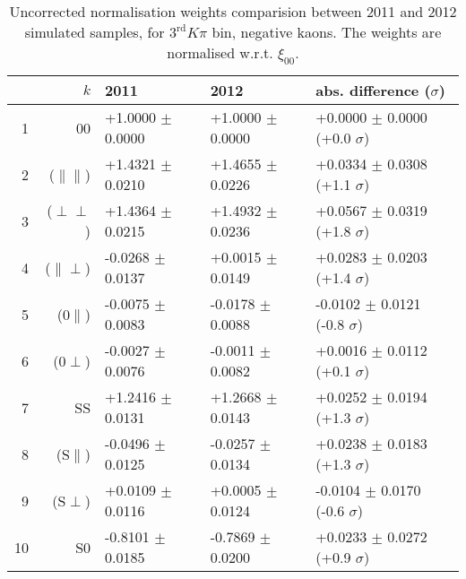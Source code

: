 \begin{table}[hbtp]
  \caption{\small Uncorrected normalisation weights comparision between 2011 and 2012 simulated samples, for $3^{\text{rd}}K\pi$ bin, negative kaons. The weights are normalised w.r.t. $\xi_{00}$.}
  \center\footnotesize
 \begin{tabular}{r r l l l}
  \multicolumn{2}{r}{$k$}            & 2011             & 2012              &   abs. difference ($\sigma$)        \\
   \hline 
  1  & 00                     & +1.0000 $\pm$  0.0000  &  +1.0000 $\pm$  0.0000  &  +0.0000 $\pm$  0.0000 (+0.0 $\sigma$) \\
  2  & ($\parallel\parallel$) & +1.4321 $\pm$  0.0210  &  +1.4655 $\pm$  0.0226  &  +0.0334 $\pm$  0.0308 (+1.1 $\sigma$) \\
  3  & ($\perp\perp$)         & +1.4364 $\pm$  0.0215  &  +1.4932 $\pm$  0.0236  &  +0.0567 $\pm$  0.0319 (+1.8 $\sigma$) \\
  4  & ($\parallel\perp$)     & -0.0268 $\pm$  0.0137  &  +0.0015 $\pm$  0.0149  &  +0.0283 $\pm$  0.0203 (+1.4 $\sigma$) \\
  5  & ($0\parallel$)         & -0.0075 $\pm$  0.0083  &  -0.0178 $\pm$  0.0088  &  -0.0102 $\pm$  0.0121 (-0.8 $\sigma$) \\
  6  & ($0\perp$)             & -0.0027 $\pm$  0.0076  &  -0.0011 $\pm$  0.0082  &  +0.0016 $\pm$  0.0112 (+0.1 $\sigma$) \\
  7  & SS                      & +1.2416 $\pm$  0.0131  &  +1.2668 $\pm$  0.0143  &  +0.0252 $\pm$  0.0194 (+1.3 $\sigma$) \\
  8  & (S$\parallel$)         & -0.0496 $\pm$  0.0125  &  -0.0257 $\pm$  0.0134  &  +0.0238 $\pm$  0.0183 (+1.3 $\sigma$) \\
  9  & (S$\perp$)             & +0.0109 $\pm$  0.0116  &  +0.0005 $\pm$  0.0124  &  -0.0104 $\pm$  0.0170 (-0.6 $\sigma$) \\
  10 &  S0                    & -0.8101 $\pm$  0.0185  &  -0.7869 $\pm$  0.0200  &  +0.0233 $\pm$  0.0272 (+0.9 $\sigma$) \\
\hline
\end{tabular}
\end{table}
